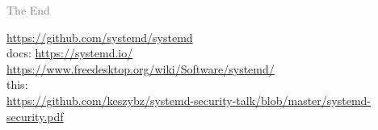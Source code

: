 \documentclass[serif]{beamer}
\begin{document}
\begin{frame}[fragile]
  \textcolor{gray}{The End}

  \bigskip

  \url{https://github.com/systemd/systemd}\\
  docs: \url{https://systemd.io/}\\
  \phantom{docs: }\url{https://www.freedesktop.org/wiki/Software/systemd/}\hspace*{-5cm}\\

  \medskip
  this:\\
  \url{https://github.com/keszybz/systemd-security-talk/blob/master/systemd-security.pdf}
\end{frame}
\end{document}
